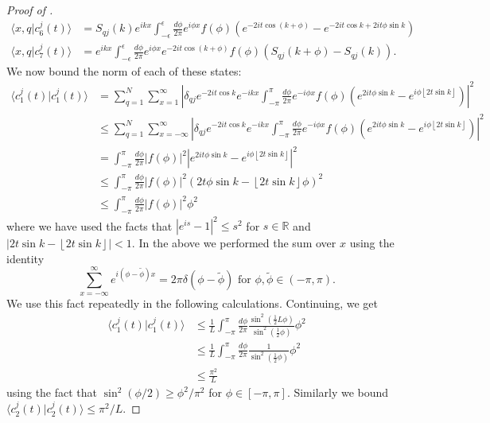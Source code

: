 \documentclass[../thesis-main/thesis-main]{subfiles}
\begin{document}
\begin{proof}[Proof of {}]
\begin{align*}
\langle x,q|c_{6}^{j}(t)\rangle & = S_{qj}(k)e^{ikx}\int_{-\epsilon}^{\epsilon}\frac{d\phi}{2\pi}e^{i\phi x}f(\phi)\left(e^{-2it\cos\left(k+\phi\right)}-e^{-2it\cos k+2it\phi\sin k}\right)\\
\langle x,q|c_{7}^{j}(t)\rangle & = e^{ikx}\int_{-\epsilon}^{\epsilon}\frac{d\phi}{2\pi}e^{i\phi x}e^{-2it\cos\left(k+\phi\right)}f(\phi)\left(S_{qj}(k+\phi)-S_{qj}(k)\right).
\end{align*}
We now bound the norm of each of these states:
\begin{align*}
\langle c_{1}^{j}(t)|c_{1}^{j}(t)\rangle & = \sum_{q=1}^{N}\sum_{x=1}^{\infty}\left|\delta_{qj}e^{-2it\cos k}e^{-ikx}\int_{-\pi}^{\pi}\frac{d\phi}{2\pi}e^{-i\phi x}f(\phi)\left(e^{2it\phi\sin k}-e^{i\phi\left\lfloor 2t\sin k\right\rfloor }\right)\right|^{2}\\
 & \leq \sum_{q=1}^{N}\sum_{x=-\infty}^{\infty}\left|\delta_{qj}e^{-2it\cos k}e^{-ikx}\int_{-\pi}^{\pi}\frac{d\phi}{2\pi}e^{-i\phi x}f(\phi)\left(e^{2it\phi\sin k}-e^{i\phi\left\lfloor 2t\sin k\right\rfloor }\right)\right|^{2}\\
 & = \int_{-\pi}^{\pi}\frac{d\phi}{2\pi}\left|f(\phi)\right|^{2}\left|e^{2it\phi\sin k}-e^{i\phi\left\lfloor 2t\sin k\right\rfloor }\right|^{2}\\
 & \leq \int_{-\pi}^{\pi}\frac{d\phi}{2\pi}\left|f(\phi)\right|^{2}\left(2t\phi\sin k-\left\lfloor 2t\sin k\right\rfloor \phi\right)^{2}\\
 & \leq \int_{-\pi}^{\pi}\frac{d\phi}{2\pi}\left|f(\phi)\right|^{2}\phi^{2}
\end{align*}
where we have used the facts that $|{e^{is}-1}|^{2} \leq s^{2}$
for $s\in\mathbb{R}$ and $\left|2t\sin k -\left\lfloor 2t\sin k\right\rfloor \right|<1$. In the above we performed the sum over $x$ using the identity
\begin{equation}
\sum_{x=-\infty}^{\infty} e^{i(\phi-\tilde{\phi})x}=2\pi\delta(\phi-\tilde{\phi}) \text{ for } \phi,\tilde{\phi}\in (-\pi,\pi).
\end{equation}
We use this fact repeatedly in the following calculations.
Continuing, we get
\begin{align*}
\langle c_{1}^{j}(t)|c_{1}^{j}(t)\rangle & \leq \frac{1}{L} \int_{-\pi}^{\pi}\frac{d\phi}{2\pi}\frac{\sin^{2}(\frac{1}{2}L\phi)}{\sin^{2}(\frac{1}{2}\phi)}\phi^{2}\\
 & \le \frac{1}{L} \int_{-\pi}^{\pi}\frac{d\phi}{2\pi}\frac{1}{\sin^{2}(\frac{1}{2}\phi)}\phi^{2}\\
 & \leq \frac{\pi^{2}}{L}
\end{align*}
using the fact that $\sin^{2}({\phi}/{2})\geq{\phi^{2}}/{\pi^{2}}$
for $\phi\in[-\pi,\pi]$. Similarly we bound $\langle c_{2}^{j}(t)|c_{2}^{j}(t)\rangle\leq{\pi^{2}}/{L}$. 


\end{proof}
\end{document}
